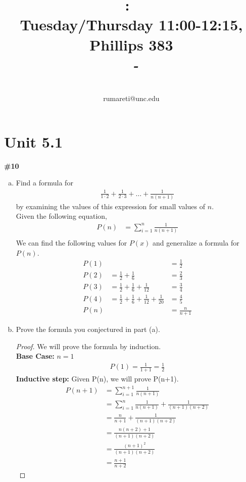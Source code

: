 \documentclass{article}
\title{
    \vspace{2in}
    \textmd{\textbf{\hmwkClass:\ \hmwkTitle}}\\
    \normalsize\vspace{0.1in}\small{Tuesday/Thursday 11:00-12:15, Phillips 383}\\
    \vspace{0.1in}\large{\textit{\hmwkClassInstructor\ - \hmwkClassTime}}
    \vspace{3in}
}
\author{\hmwkAuthorName\\\small{rumareti@unc.edu}}
\date{}
\newcommand{\unit}[1]{\section{Unit #1}}
\newcommand{\problem}[1]{\textbf{\##1}}
\newcommand{\prob}[1]{\problem{#1}}
\begin{document}
\maketitle

\pagebreak

\unit{5.1}
\prob{10}
\begin{enumerate}[a)]
    \item Find a formula for
    \begin{align*}
        \frac{1}{1\cdot2}+\frac{1}{2\cdot3}+\ldots+\frac{1}{n(n+1)}
    \end{align*}
    by examining the values of this expression for small values of \(n\).\\

Given the following equation,
\begin{align*}
    P(n) &= \sum_{i=1}^{n}\frac{1}{n(n+1)}\\
\end{align*}
We can find the following values for \(P(x)\) and generalize a formula for \(P(n)\).
\begin{align*}
    P(1) &&= \frac{1}{2}\\
    P(2) &= \frac{1}{2}+\frac{1}{6}&=\frac{2}{3}\\
    P(3) &= \frac{1}{2}+\frac{1}{6}+\frac{1}{12}&=\frac{3}{4}\\
    P(4) &= \frac{1}{2}+\frac{1}{6}+\frac{1}{12}+\frac{1}{20}&=\frac{4}{5}\\
    P(n) &&= \frac{n}{n+1}
\end{align*}
    \item Prove the formula you conjectured in part (a).
\begin{proof}
    We will prove the formula by induction.\\
    \textbf{Base Case:} \(n=1\)
    \begin{align*}
        P(1) = \frac{1}{1+1} = \frac{1}{2}
    \end{align*}
    \textbf{Inductive step:}
    Given P(n), we will prove P(n+1).
    \begin{align*}
        P(n+1) &= \sum_{i=1}^{n+1}\frac{1}{n(n+1)}\\
        &= \sum_{i=1}^{n}\frac{1}{n(n+1)}+\frac{1}{(n+1)(n+2)}\\
        &= \frac{n}{n+1}+\frac{1}{(n+1)(n+2)}\\
        &= \frac{n(n+2)+1}{(n+1)(n+2)}\\
        &= \frac{(n+1)^2}{(n+1)(n+2)}\\
        &= \frac{n+1}{n+2}
    \end{align*}
\end{proof}
\end{enumerate}
\end{document}
